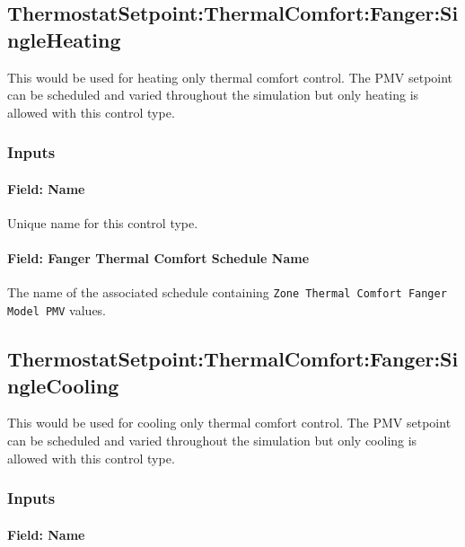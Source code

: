 \subsection{ThermostatSetpoint:ThermalComfort:Fanger:SingleHeating}\label{thermostatsetpointthermalcomfortfangersingleheating}

This would be used for heating only thermal comfort control. The PMV setpoint can be scheduled and varied throughout the simulation but only heating is allowed with this control type.

\subsubsection{Inputs}\label{inputs-10-023}

\paragraph{Field: Name}\label{field-name-8-024}

Unique name for this control type.

\paragraph{Field: Fanger Thermal Comfort Schedule Name}\label{field-fanger-thermal-comfort-schedule-name}

The name of the associated schedule containing \lstinline!Zone Thermal Comfort Fanger Model PMV! values.

\subsection{ThermostatSetpoint:ThermalComfort:Fanger:SingleCooling}\label{thermostatsetpointthermalcomfortfangersinglecooling}

This would be used for cooling only thermal comfort control. The PMV setpoint can be scheduled and varied throughout the simulation but only cooling is allowed with this control type.

\subsubsection{Inputs}\label{inputs-11-022}

\paragraph{Field: Name}\label{field-name-9-021}

